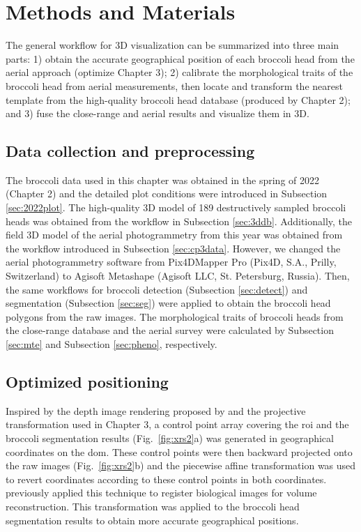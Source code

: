 \section{Methods and Materials}

The general workflow for 3D visualization can be summarized into three main parts: 1) obtain the accurate geographical position of each broccoli head from the aerial approach (optimize Chapter 3); 2) calibrate the morphological traits of the broccoli head from aerial measurements, then locate and transform the nearest template from the high-quality broccoli head database (produced by Chapter 2); and 3) fuse the close-range and aerial results and visualize them in 3D.

\subsection{Data collection and preprocessing}

The broccoli data used in this chapter was obtained in the spring of 2022 (Chapter 2) and the detailed plot conditions were introduced in Subsection \ref{sec:2022plot}. The high-quality 3D model of 189 destructively sampled broccoli heads was obtained from the workflow in Subsection \ref{sec:3ddb}. Additionally, the field 3D model of the aerial photogrammetry from this year was obtained from the workflow introduced in Subsection \ref{sec:cp3data}. However, we changed the aerial photogrammetry software from Pix4DMapper Pro (Pix4D, S.A., Prilly, Switzerland) to Agisoft Metashape (Agisoft LLC, St. Petersburg, Russia). Then, the same workflows for broccoli detection (Subsection \ref{sec:detect}) and segmentation (Subsection \ref{sec:seg}) were applied to obtain the broccoli head polygons from the raw images. The morphological traits of broccoli heads from the close-range database and the aerial survey were calculated by Subsection \ref{sec:mte} and Subsection \ref{sec:pheno}, respectively.

\subsection{Optimized positioning}

Inspired by the depth image rendering proposed by \citet{shao_cattle_2020} and the projective transformation used in Chapter 3, a control point array covering the \gls{roi} and the broccoli segmentation results (Fig.~\ref{fig:xrs2}a) was generated in geographical coordinates on the \gls{dom}. These control points were then backward projected onto the raw images (Fig.~\ref{fig:xrs2}b) and the piecewise affine transformation was used to revert coordinates according to these control points in both coordinates. \citet{pitiot_piecewise_2006} previously applied this technique to register biological images for volume reconstruction. This transformation was applied to the broccoli head segmentation results to obtain more accurate geographical positions.

